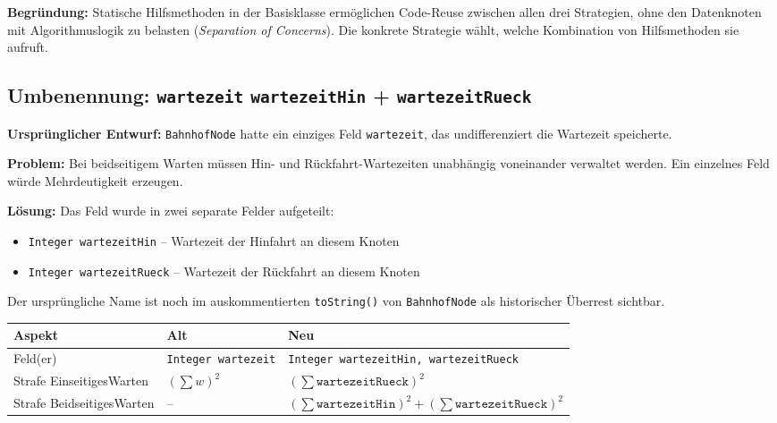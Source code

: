 \documentclass[12pt,a4paper]{article}
\begin{document}
\textbf{Begründung:} Statische Hilfsmethoden in der Basisklasse ermöglichen Code-Reuse
zwischen allen drei Strategien, ohne den Datenknoten mit Algorithmuslogik zu
belasten (\textit{Separation of Concerns}). Die konkrete Strategie wählt, welche
Kombination von Hilfsmethoden sie aufruft.

\subsection{Umbenennung: \texttt{wartezeit} \textrightarrow{} \texttt{wartezeitHin} + \texttt{wartezeitRueck}}

\textbf{Ursprünglicher Entwurf:} \texttt{BahnhofNode} hatte ein einziges Feld
\texttt{wartezeit}, das undifferenziert die Wartezeit speicherte.

\textbf{Problem:} Bei beidseitigem Warten müssen Hin- und Rückfahrt-Wartezeiten
unabhängig voneinander verwaltet werden. Ein einzelnes Feld würde Mehrdeutigkeit
erzeugen.

\textbf{Lösung:} Das Feld wurde in zwei separate Felder aufgeteilt:
\begin{itemize}
  \item \texttt{Integer wartezeitHin} – Wartezeit der Hinfahrt an diesem Knoten
  \item \texttt{Integer wartezeitRueck} – Wartezeit der Rückfahrt an diesem Knoten
\end{itemize}

Der ursprüngliche Name ist noch im auskommentierten \texttt{toString()} von
\texttt{BahnhofNode} als historischer Überrest sichtbar.

\begin{center}
\begin{tabular}{lll}
\toprule
\textbf{Aspekt}       & \textbf{Alt}                   & \textbf{Neu}                                      \\
\midrule
Feld(er)              & \texttt{Integer wartezeit}     & \texttt{Integer wartezeitHin, wartezeitRueck}     \\
Strafe EinseitigesWarten & $(\sum w)^2$                & $(\sum \mathtt{wartezeitRueck})^2$                \\
Strafe BeidseitigesWarten & --                         & $(\sum \mathtt{wartezeitHin})^2 + (\sum \mathtt{wartezeitRueck})^2$ \\
\bottomrule
\end{tabular}
\end{center}
\end{document}
